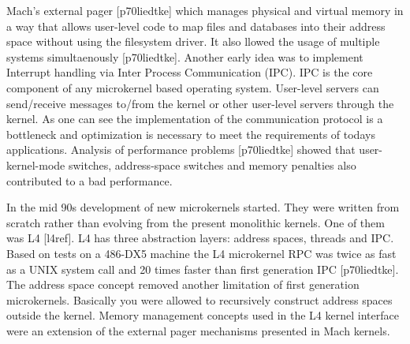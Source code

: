 \documentclass{acm_proc_article-sp}
\begin{document}
Mach's external pager [p70liedtke] which manages physical and virtual memory in a way that allows
user-level code to map files and databases into their address space without using the filesystem
driver.
It also llowed the usage of multiple systems simultaenously [p70liedtke].
Another early idea was to implement Interrupt handling via Inter Process Communication (IPC).
IPC is the core component of any microkernel based operating system.
User-level servers can send/receive messages to/from the kernel or other user-level servers
through the kernel.
As one can see the implementation of the communication protocol is a bottleneck and optimization
is necessary to meet the requirements of todays applications.
Analysis of performance problems [p70liedtke] showed that user-kernel-mode switches, address-space
switches and memory penalties also contributed to a bad performance.

In the mid 90s development of new microkernels started.
They were written from scratch rather than evolving from the present monolithic kernels.
One of them was L4 [l4ref].
L4 has three abstraction layers: address spaces, threads and IPC.
Based on tests on a 486-DX5 machine the L4 microkernel RPC was twice as fast as a UNIX system call
and 20 times faster than first generation IPC [p70liedtke].
The address space concept removed another limitation of first generation microkernels.
Basically you were allowed to recursively construct address spaces outside the kernel.
Memory management concepts used in the L4 kernel interface were an extension of the external
pager mechanisms presented in Mach kernels.
\end{document}
